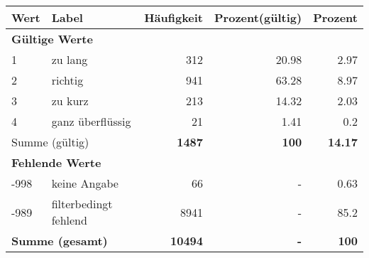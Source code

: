      \begin{longtable}{lXrrr}
     \toprule
     \textbf{Wert} & \textbf{Label} & \textbf{Häufigkeit} & \textbf{Prozent(gültig)} & \textbf{Prozent} \\
     \endhead
     \midrule
     \multicolumn{5}{l}{\textbf{Gültige Werte}}\\

     1 &
     \multicolumn{1}{X}{ zu lang   } &


       \num{312} &
       \num[round-mode=places,round-precision=2]{20,98} &
         \num[round-mode=places,round-precision=2]{2,97} \\

     2 &
     \multicolumn{1}{X}{ richtig   } &


       \num{941} &
       \num[round-mode=places,round-precision=2]{63,28} &
         \num[round-mode=places,round-precision=2]{8,97} \\

     3 &
     \multicolumn{1}{X}{ zu kurz   } &


       \num{213} &
       \num[round-mode=places,round-precision=2]{14,32} &
         \num[round-mode=places,round-precision=2]{2,03} \\

     4 &
     \multicolumn{1}{X}{ ganz überflüssig   } &


       \num{21} &
       \num[round-mode=places,round-precision=2]{1,41} &
         \num[round-mode=places,round-precision=2]{0,2} \\
     \midrule
     \multicolumn{2}{l}{Summe (gültig)} &
       \textbf{\num{1487}} &
     \textbf{100} &
       \textbf{\num[round-mode=places,round-precision=2]{14,17}} \\
     \multicolumn{5}{l}{\textbf{Fehlende Werte}}\\
       -998 &
       keine Angabe &
         \num{66} &
        - &
         \num[round-mode=places,round-precision=2]{0,63} \\
       -989 &
       filterbedingt fehlend &
         \num{8941} &
        - &
         \num[round-mode=places,round-precision=2]{85,2} \\
     \midrule
     \multicolumn{2}{l}{\textbf{Summe (gesamt)}} &
          \textbf{\num{10494}} &
        \textbf{-} &
        \textbf{100} \\
     \bottomrule
     \end{longtable}
     
